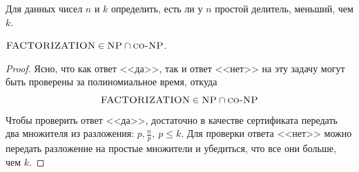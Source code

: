 
    \begin{Def}
        Для данных чисел $n$ и $k$ определить, есть ли у $n$ простой делитель, меньший, чем $k$.
    \end{Def}

    \begin{Thm}
        $\textsc{FACTORIZATION} \in \textsc{NP} \cap \textsc{co-NP}$.
    \end{Thm}

    \begin{proof}
        Ясно, что как ответ <<да>>, так и ответ <<нет>> на эту задачу могут быть проверены за полиномиальное время, откуда 
        \[\textsc{FACTORIZATION} \in \textsc{NP} \cap \textsc{co-NP}\]
        Чтобы проверить ответ <<да>>, достаточно в качестве сертификата передать два множителя из разложения: $p, \frac{n}{p}, \ p \leqslant k$.
        Для проверки ответа <<нет>> можно передать разложение на простые множители и убедиться, что все они больше, чем $k$.
    \end{proof}

    
    

